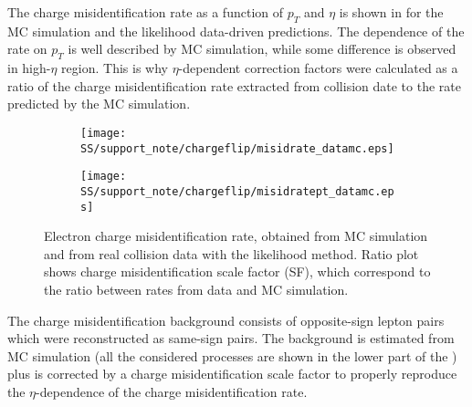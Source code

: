 The charge misidentification rate as a function of $p_T$ and $\eta$ is shown in 
for the MC simulation and the likelihood data-driven predictions.
The dependence of the rate on $p_T$ is well described by MC simulation, while some difference is observed
in high-$\eta$ region. This is why $\eta$-dependent correction factors were calculated as a ratio of the charge misidentification rate extracted from collision date 
to the rate predicted by the MC simulation.

\begin{figure}
\begin{subfigure}{.5\textwidth}
  \centering
  \texttt{[image: SS/support\_note/chargeflip/misidrate\_datamc.eps]}
\end{subfigure}%
\begin{subfigure}{.5\textwidth}
  \centering
  \texttt{[image: SS/support\_note/chargeflip/misidratept\_datamc.eps]}
\end{subfigure}
\caption{Electron charge misidentification rate, obtained from MC simulation and from real collision data with the likelihood method.
Ratio plot shows charge misidentification scale factor (SF), which correspond to the ratio between rates from data and MC simulation.}
\label{fig:charge_flip_data_vs_mc}
\end{figure}

The charge misidentification background consists of opposite-sign lepton pairs which were reconstructed as same-sign pairs.
The background is estimated from MC simulation (all the considered processes are shown in the lower part of the ) 
plus is corrected by a charge misidentification scale factor to properly reproduce the $\eta$-dependence of the charge misidentification rate.

